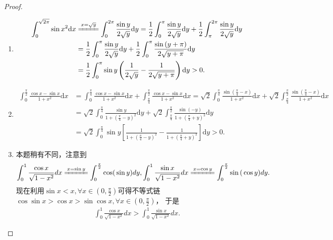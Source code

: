 \documentclass[../../main.tex]{subfiles}
\begin{document}
\begin{proof}
\begin{enumerate}
\item \begin{align*}
\int_0^{\sqrt{2\pi}}{\sin x^2\mathrm{d}x}&\xlongequal{x=\sqrt{y}}\int_0^{2\pi}{\frac{\sin y}{2\sqrt{y}}\mathrm{d}y}=\frac{1}{2}\int_0^{\pi}{\frac{\sin y}{2\sqrt{y}}\mathrm{d}y}+\frac{1}{2}\int_{\pi}^{2\pi}{\frac{\sin y}{2\sqrt{y}}\mathrm{d}y}
\\
&=\frac{1}{2}\int_0^{\pi}{\frac{\sin y}{2\sqrt{y}}\mathrm{d}y}+\frac{1}{2}\int_0^{\pi}{\frac{\sin \left( y+\pi \right)}{2\sqrt{y+\pi}}\mathrm{d}y}
\\
&=\frac{1}{2}\int_0^{\pi}{\sin y\left( \frac{1}{2\sqrt{y}}-\frac{1}{2\sqrt{y+\pi}} \right) \mathrm{d}y}>0.
\end{align*}

\item \begin{align*}
\int_0^{\frac{\pi}{2}}{\frac{\cos x-\sin x}{1+x^2}\mathrm{d}x}&=\int_0^{\frac{\pi}{4}}{\frac{\cos x-\sin x}{1+x^2}\mathrm{d}x}+\int_{\frac{\pi}{4}}^{\frac{\pi}{2}}{\frac{\cos x-\sin x}{1+x^2}\mathrm{d}x}=\sqrt{2}\int_0^{\frac{\pi}{4}}{\frac{\sin \left( \frac{\pi}{4}-x \right)}{1+x^2}\mathrm{d}x}+\sqrt{2}\int_{\frac{\pi}{4}}^{\frac{\pi}{2}}{\frac{\sin \left( \frac{\pi}{4}-x \right)}{1+x^2}\mathrm{d}x}
\\
&=\sqrt{2}\int_0^{\frac{\pi}{4}}{\frac{\sin y}{1+\left( \frac{\pi}{4}-y \right) ^2}\mathrm{d}y}+\sqrt{2}\int_{\frac{\pi}{4}}^{\frac{\pi}{2}}{\frac{\sin \left( -y \right)}{1+\left( \frac{\pi}{4}+y \right) ^2}\mathrm{d}y}
\\
&=\sqrt{2}\int_0^{\frac{\pi}{4}}{\sin y\left[ \frac{1}{1+\left( \frac{\pi}{4}-y \right) ^2}-\frac{1}{1+\left( \frac{\pi}{4}+y \right) ^2} \right] \mathrm{d}y}>0.
\end{align*}

\item 本题稍有不同，注意到
\begin{align*}
\int_0^1{\frac{\cos x}{\sqrt{1-x^2}}dx\xlongequal{x=\sin y}\int_0^{\frac{\pi}{2}}{\mathrm{cos(}\sin y)dy,\int_0^1{\frac{\sin x}{\sqrt{1-x^2}}dx\xlongequal{x=\cos y}\int_0^{\frac{\pi}{2}}{\sin\mathrm{(}\cos y)dy}}}}.
\end{align*}
现在利用\(\sin x < x, \forall x \in (0, \frac{\pi}{2})\)可得不等式链
\(\cos\sin x > \cos x > \sin\cos x, \forall x \in (0, \frac{\pi}{2})\)，
于是
\begin{align*}
\int_{0}^{1}\frac{\cos x}{\sqrt{1 - x^{2}}}dx > \int_{0}^{1}\frac{\sin x}{\sqrt{1 - x^{2}}}dx.
\end{align*} 
\end{enumerate}
\end{proof}
\end{document}
